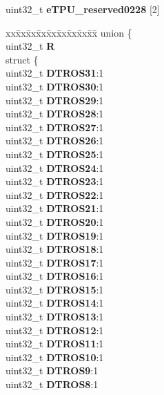 \begin{DoxyCompactItemize}
\begin{tabbing}
\end{tabbing}\item 
\mbox{\label{structETPU__tag_a7429bc88a9c440d9cfd265ce26ed9b61}} 
uint32\+\_\+t {\bfseries e\+T\+P\+U\+\_\+reserved0228} \mbox{[}2\mbox{]}
\item 
\mbox{\label{structETPU__tag_af6e99a9a28600383fc35ef04703142fa}} 
\begin{tabbing}
xx\=xx\=xx\=xx\=xx\=xx\=xx\=xx\=xx\=\kill
union \{\\
\>uint32\_t {\bfseries R}\\
\>struct \{\\
\>\>uint32\_t {\bfseries DTROS31}:1\\
\>\>uint32\_t {\bfseries DTROS30}:1\\
\>\>uint32\_t {\bfseries DTROS29}:1\\
\>\>uint32\_t {\bfseries DTROS28}:1\\
\>\>uint32\_t {\bfseries DTROS27}:1\\
\>\>uint32\_t {\bfseries DTROS26}:1\\
\>\>uint32\_t {\bfseries DTROS25}:1\\
\>\>uint32\_t {\bfseries DTROS24}:1\\
\>\>uint32\_t {\bfseries DTROS23}:1\\
\>\>uint32\_t {\bfseries DTROS22}:1\\
\>\>uint32\_t {\bfseries DTROS21}:1\\
\>\>uint32\_t {\bfseries DTROS20}:1\\
\>\>uint32\_t {\bfseries DTROS19}:1\\
\>\>uint32\_t {\bfseries DTROS18}:1\\
\>\>uint32\_t {\bfseries DTROS17}:1\\
\>\>uint32\_t {\bfseries DTROS16}:1\\
\>\>uint32\_t {\bfseries DTROS15}:1\\
\>\>uint32\_t {\bfseries DTROS14}:1\\
\>\>uint32\_t {\bfseries DTROS13}:1\\
\>\>uint32\_t {\bfseries DTROS12}:1\\
\>\>uint32\_t {\bfseries DTROS11}:1\\
\>\>uint32\_t {\bfseries DTROS10}:1\\
\>\>uint32\_t {\bfseries DTROS9}:1\\
\>\>uint32\_t {\bfseries DTROS8}:1\\

\end{tabbing}
\end{DoxyCompactItemize}

